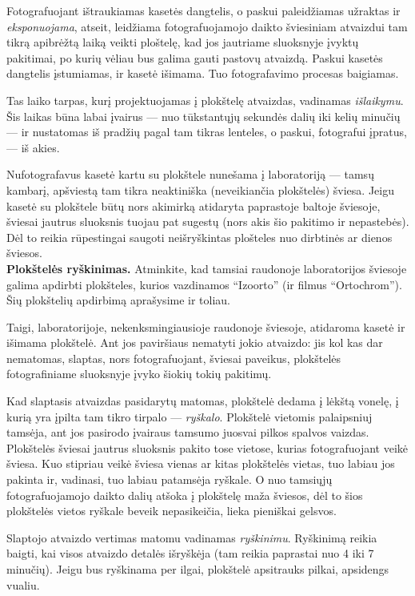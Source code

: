 \documentclass{book}
\begin{document}
			Fotografuojant ištraukiamas kasetės dangtelis, o paskui paleidžiamas užraktas ir \textit{eksponuojama}, atseit, leidžiama fotografuojamojo daikto šviesiniam atvaizdui tam tikrą apibrėžtą laiką veikti ploštelę, kad jos jautriame sluoksnyje įvyktų pakitimai, po kurių vėliau bus galima gauti pastovų atvaizdą. Paskui kasetės dangtelis įstumiamas, ir kasetė išimama. Tuo fotografavimo procesas baigiamas.

			Tas laiko tarpas, kurį projektuojamas į plokštelę atvaizdas, vadinamas \textit{išlaikymu}. Šis laikas būna labai įvairus --- nuo tūkstantųjų sekundės dalių iki kelių minučių --- ir nustatomas iš pradžių pagal tam tikras lenteles, o paskui, fotografui įpratus, --- iš akies.

			Nufotografavus kasetė kartu su plokštele nunešama į laboratoriją --- tamsų kambarį, apšviestą tam tikra neaktiniška (neveikiančia plokštelės) šviesa. Jeigu kasetė su plokštele būtų nors akimirką atidaryta paprastoje baltoje šviesoje, šviesai jautrus sluoksnis tuojau pat sugestų (nors akis šio pakitimo ir nepastebės). Dėl to reikia rūpestingai saugoti neišryškintas plošteles nuo dirbtinės ar dienos šviesos.\\

			\textbf{Plokštelės ryškinimas.} Atminkite, kad tamsiai raudonoje laboratorijos šviesoje galima apdirbti plokšteles, kurios vazdinamos ``Izoorto'' (ir filmus ``Ortochrom''). Šių plokštelių apdirbimą aprašysime ir toliau.

			Taigi, laboratorijoje, nekenksmingiausioje raudonoje šviesoje, atidaroma kasetė ir išimama plokštelė. Ant jos paviršiaus nematyti jokio atvaizdo: jis kol kas dar nematomas, slaptas, nors fotografuojant, šviesai paveikus, plokštelės fotografiniame sluoksnyje įvyko šiokių tokių pakitimų.

			Kad slaptasis atvaizdas pasidarytų matomas, plokštelė dedama į lėkštą vonelę, į kurią yra įpilta tam tikro tirpalo --- \textit{ryškalo}. Plokštelė vietomis palaipsniuj tamsėja, ant jos pasirodo įvairaus tamsumo juosvai pilkos spalvos vaizdas. Plokštelės šviesai jautrus sluoksnis pakito tose vietose, kurias fotografuojant veikė šviesa. Kuo stipriau veikė šviesa vienas ar kitas plokštelės vietas, tuo labiau jos pakinta ir, vadinasi, tuo labiau patamsėja ryškale. O nuo tamsiųjų fotografuojamojo daikto dalių atšoka į plokštelę maža šviesos, dėl to šios plokštelės vietos  ryškale beveik nepasikeičia, lieka pieniškai gelsvos.

			Slaptojo atvaizdo vertimas matomu vadinamas \textit{ryškinimu}. Ryškinimą reikia baigti, kai visos atvaizdo detalės išryškėja (tam reikia paprastai nuo 4 iki 7 minučių). Jeigu bus ryškinama per ilgai, plokštelė apsitrauks pilkai, apsidengs vualiu.
\end{document}
